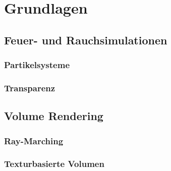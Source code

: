 \section{Grundlagen}


\subsection{Feuer- und Rauchsimulationen}
\subsubsection{Partikelsysteme}
\subsubsection{Transparenz}



\subsection{Volume Rendering}
\subsubsection{Ray-Marching}
\subsubsection{Texturbasierte Volumen}


\newpage
